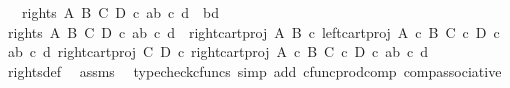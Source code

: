 \begin{isabellebody}
\ \ \ {\isachardoublequoteopen}rights\ A\ B\ C\ D\ {\isasymcirc}\isactrlsub c\ {\isasymlangle}{\isasymlangle}a{\isacharcomma}{\kern0pt}b{\isasymrangle}{\isacharcomma}{\kern0pt}\ {\isasymlangle}c{\isacharcomma}{\kern0pt}\ d{\isasymrangle}{\isasymrangle}\ {\isacharequal}{\kern0pt}\ {\isasymlangle}b{\isacharcomma}{\kern0pt}d{\isasymrangle}{\isachardoublequoteclose}\isanewline
%
\isadelimproof
%
\endisadelimproof
%
\isatagproof
{}\isamarkupfalse%
\ {\isacharminus}{\kern0pt}\isanewline
\ \ \isamarkupfalse%
\ {\isachardoublequoteopen}rights\ A\ B\ C\ D\ {\isasymcirc}\isactrlsub c\ {\isasymlangle}{\isasymlangle}a{\isacharcomma}{\kern0pt}b{\isasymrangle}{\isacharcomma}{\kern0pt}\ {\isasymlangle}c{\isacharcomma}{\kern0pt}\ d{\isasymrangle}{\isasymrangle}\ {\isacharequal}{\kern0pt}\ {\isasymlangle}right{\isacharunderscore}{\kern0pt}cart{\isacharunderscore}{\kern0pt}proj\ A\ B\ {\isasymcirc}\isactrlsub c\ left{\isacharunderscore}{\kern0pt}cart{\isacharunderscore}{\kern0pt}proj\ {\isacharparenleft}{\kern0pt}A\ {\isasymtimes}\isactrlsub c\ B{\isacharparenright}{\kern0pt}\ {\isacharparenleft}{\kern0pt}C\ {\isasymtimes}\isactrlsub c\ D{\isacharparenright}{\kern0pt}\ {\isasymcirc}\isactrlsub c\ {\isasymlangle}{\isasymlangle}a{\isacharcomma}{\kern0pt}b{\isasymrangle}{\isacharcomma}{\kern0pt}\ {\isasymlangle}c{\isacharcomma}{\kern0pt}\ d{\isasymrangle}{\isasymrangle}{\isacharcomma}{\kern0pt}\ right{\isacharunderscore}{\kern0pt}cart{\isacharunderscore}{\kern0pt}proj\ C\ D\ {\isasymcirc}\isactrlsub c\ right{\isacharunderscore}{\kern0pt}cart{\isacharunderscore}{\kern0pt}proj\ {\isacharparenleft}{\kern0pt}A\ {\isasymtimes}\isactrlsub c\ B{\isacharparenright}{\kern0pt}\ {\isacharparenleft}{\kern0pt}C\ {\isasymtimes}\isactrlsub c\ D{\isacharparenright}{\kern0pt}\ {\isasymcirc}\isactrlsub c\ {\isasymlangle}{\isasymlangle}a{\isacharcomma}{\kern0pt}b{\isasymrangle}{\isacharcomma}{\kern0pt}\ {\isasymlangle}c{\isacharcomma}{\kern0pt}\ d{\isasymrangle}{\isasymrangle}{\isasymrangle}{\isachardoublequoteclose}\isanewline
\ \ \ \ \isamarkupfalse%
\ rights{\isacharunderscore}{\kern0pt}def\ \isamarkupfalse%
\ assms\ \isamarkupfalse%
\ {\isacharparenleft}{\kern0pt}typecheck{\isacharunderscore}{\kern0pt}cfuncs{\isacharcomma}{\kern0pt}\ simp\ add{\isacharcolon}{\kern0pt}\ cfunc{\isacharunderscore}{\kern0pt}prod{\isacharunderscore}{\kern0pt}comp\ comp{\isacharunderscore}{\kern0pt}associative{}{\isacharparenright}{\kern0pt}\isanewline
\ \ \isamarkupfalse%
\ \isamarkupfalse%

\end{isabellebody}
